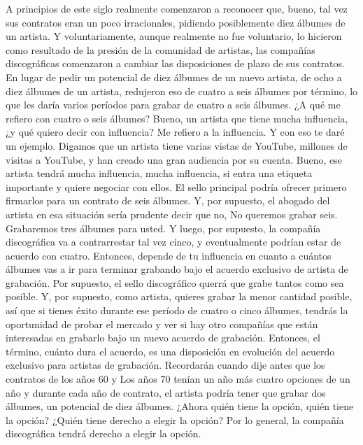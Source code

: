 \documentclass[10pt]{book}
\begin{document}
A principios de este siglo realmente comenzaron a reconocer que, bueno, tal vez sus contratos eran un poco irracionales, pidiendo posiblemente diez álbumes de un artista. Y voluntariamente, aunque realmente no fue voluntario, lo hicieron como resultado de la presión de la comunidad de artistas, las compañías discográficas comenzaron a cambiar las disposiciones de plazo de sus contratos. En lugar de pedir un potencial de diez álbumes de un nuevo artista, de ocho a diez álbumes de un artista, redujeron eso de cuatro a seis álbumes por término, lo que les daría varios períodos para grabar de cuatro a seis álbumes. ¿A qué me refiero con cuatro o seis álbumes? Bueno, un artista que tiene mucha influencia, ¿y qué quiero decir con influencia? Me refiero a la influencia. Y con eso te daré un ejemplo. Digamos que un artista tiene varias vistas de YouTube, millones de visitas a YouTube, y han creado una gran audiencia por su cuenta. Bueno, ese artista tendrá mucha influencia, mucha influencia, si entra una etiqueta importante y quiere negociar con ellos. El sello principal podría ofrecer primero firmarlos para un contrato de seis álbumes. Y, por supuesto, el abogado del artista en esa situación sería prudente decir que no, No queremos grabar seis. Grabaremos tres álbumes para usted. Y luego, por supuesto, la compañía discográfica va a contrarrestar tal vez cinco, y eventualmente podrían estar de acuerdo con cuatro. Entonces, depende de tu influencia en cuanto a cuántos álbumes vas a ir para terminar grabando bajo el acuerdo exclusivo de artista de grabación. Por supuesto, el sello discográfico querrá que grabe tantos como sea posible. Y, por supuesto, como artista, quieres grabar la menor cantidad posible, así que si tienes éxito durante ese período de cuatro o cinco álbumes, tendrás la oportunidad de probar el mercado y ver si hay otro compañías que están interesadas en grabarlo bajo un nuevo acuerdo de grabación. Entonces, el término, cuánto dura el acuerdo, es una disposición en evolución del acuerdo exclusivo para artistas de grabación. Recordarán cuando dije antes que los contratos de los años 60 y Los años 70 tenían un año más cuatro opciones de un año y durante cada año de contrato, el artista podría tener que grabar dos álbumes, un potencial de diez álbumes. ¿Ahora quién tiene la opción, quién tiene la opción? ¿Quién tiene derecho a elegir la opción? Por lo general, la compañía discográfica tendrá derecho a elegir la opción.\\
\end{document}

